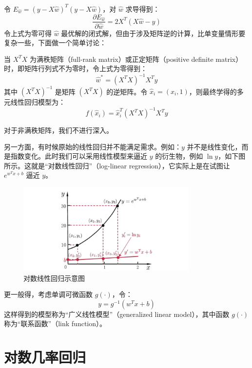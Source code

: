 \documentclass[12pt, a4paper]{article} %
\begin{document}
令 $E_{\hat{w}} = {\left( {y - X\hat w} \right)^T}\left( {y - X\hat w} \right)$，对 $\hat{w}$ 求导得到：
\begin{equation*}
    \frac{{\partial {E_{\hat w}}}}{{\partial \hat w}} = 2{X^T}(X\hat w - y)
\end{equation*}
令上式为零可得 $\hat{w}$ 最优解的闭式解，但由于涉及矩阵逆的计算，比单变量情形要复杂一些，下面做一个简单讨论：

当 $X^TX$ 为满秩矩阵（full-rank matrix）或正定矩阵（positive definite matrix）时，即矩阵行列式不为零时，令上式为零得到：
\begin{equation*}
    \hat{w}^* = (X^TX)^{-1} X^T y
\end{equation*}
其中 $(X^TX)^{-1}$ 是矩阵 $(X^TX)$ 的逆矩阵。令 $\hat{x}_i = (x_i, 1)$，则最终学得的多元线性回归模型为：
\begin{equation*}
    f(\hat{x}_i) = \hat{x}_i^T (X^TX)^{-1} X^Ty
\end{equation*}

对于非满秩矩阵，我们不进行深入。

另一方面，有时候原始的线性回归并不能满足需求。例如：$y$ 并不是线性变化，而是指数变化。此时我们可以采用线性模型来逼近 $y$ 的衍生物，例如 $\ln y$，如下图所示。这就是“对数线性回归”（log-linear regression），它实际上是在试图让 $e^{w^Tx +b}$ 逼近 $y$。

\begin{figure}[H]
    \centering
    \includegraphics[width=0.8\textwidth]{../img/3-1-对数线性回归示意图.png}
    \caption{对数线性回归示意图}
    \label{fig:对数线性回归示意图}
\end{figure}

更一般得，考虑单调可微函数 $g(\cdot)$，令：
\begin{equation*}
    y = g^{-1} (w^T x + b)
\end{equation*}
这样得到的模型称为“广义线性模型”（generalized linear model），其中函数 $g(\cdot)$ 称为“联系函数”（link function）。

\section{对数几率回归}
\end{document}
